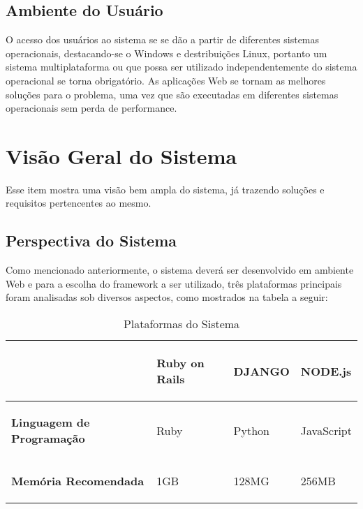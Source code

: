 \subsection{Ambiente do Usuário}

O acesso dos usuários ao sistema se se dão a partir de diferentes sistemas operacionais, destacando-se o Windows e destribuições Linux, portanto um sistema multiplataforma ou que possa ser utilizado independentemente do sistema operacional se torna obrigatório. As aplicações Web se tornam as melhores soluções para o problema, uma vez que são executadas em diferentes sistemas operacionais sem perda de performance.

\section{Visão Geral do Sistema}

Esse item mostra uma visão bem ampla do sistema, já trazendo soluções e requisitos pertencentes ao mesmo.

\subsection{Perspectiva do Sistema}

Como mencionado anteriormente, o sistema deverá ser desenvolvido em ambiente Web e para a escolha do framework a ser utilizado, três plataformas principais foram analisadas sob diversos aspectos, como mostrados na tabela a seguir:

\begin{table}[H]
	\begin{tabular}{| m{4cm} | m{4cm} | m{4cm} | m{4cm} |}
		\hline
		& \begin{center} \textbf{Ruby on Rails} \end{center} & \begin{center} \textbf{DJANGO} \end{center} & \begin{center} \textbf{NODE.js} \end{center}\tabularnewline
		\hline
		\begin{center} \textbf{Linguagem de Programação} \end{center} & Ruby & Python & JavaScript\tabularnewline
		\hline
		\begin{center} \textbf{Memória Recomendada} \end{center} & 1GB & 128MG & 256MB\tabularnewline
		\hline
	\end{tabular}
	\caption{Plataformas do Sistema}
	\label{Plataformas_do_Sistema}
\end{table}


